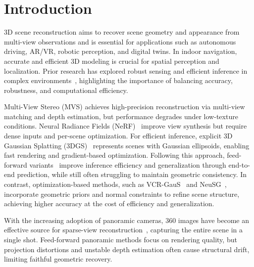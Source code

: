 \section{Introduction}\label{Introduction}

3D scene reconstruction aims to recover scene geometry and appearance from multi-view observations and is essential for applications such as autonomous driving, AR/VR, robotic perception, and digital twins. In indoor navigation, accurate and efficient 3D modeling is crucial for spatial perception and localization. Prior research has explored robust sensing and efficient inference in complex environments~\cite{Knowledge-based,Nonconvex,Cost-Effective}, highlighting the importance of balancing accuracy, robustness, and computational efficiency.

Multi-View Stereo (MVS) achieves high-precision reconstruction via multi-view matching and depth estimation, but performance degrades under low-texture conditions. Neural Radiance Fields (NeRF)~\cite{nerf} improve view synthesis but require dense inputs and per-scene optimization. For efficient inference, explicit 3D Gaussian Splatting (3DGS)~\cite{3DGS} represents scenes with Gaussian ellipsoids, enabling fast rendering and gradient-based optimization. Following this approach, feed-forward variants~\cite{pixelsplat,mvsplat} improve inference efficiency and generalization through end-to-end prediction, while still often struggling to maintain geometric consistency. In contrast, optimization-based methods, such as VCR-GauS~\cite{vcr} and NeuSG~\cite{neusg}, incorporate geometric priors and normal constraints to refine scene structure, achieving higher accuracy at the cost of efficiency and generalization.

With the increasing adoption of panoramic cameras, 360 images have become an effective source for sparse-view reconstruction~\cite{wu2023360}, capturing the entire scene in a single shot. Feed-forward panoramic methods focus on rendering quality, but projection distortions and unstable depth estimation often cause structural drift, limiting faithful geometric recovery.

